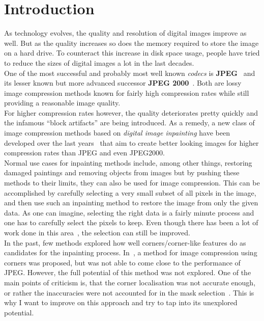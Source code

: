 \chapter{Introduction}\label{ch:Intro}
As technology evolves, the quality and resolution of digital images improve as well. But as the
quality increases so does the memory required to store the image on a hard drive. To counteract
this increase in disk space usage, people have tried to reduce the sizes of digital images a lot in the
last decades.\\
One of the most successful and probably most well known \textit{codecs}
is \textbf{JPEG}~\cite{wallace91} and its lesser known but more advanced successor \textbf{JPEG
2000}~\cite{jpeg2000}. Both are lossy image compression methods
known for fairly high compression rates while still providing a reasonable image quality.\\
For
higher compression rates however, the quality deteriorates pretty quickly and the infamous ``block
artifacts'' are being introduced. As a remedy, a new class of image compression methods based on
\textit{digital image inpainting} have been developed over the last
years~\cite{galic05, galic08, mainberger12, peloquin09, zimmer07, mainberger09, mainberger10, dong07, schmaltz09} that
aim to create better looking images for higher compression rates than JPEG and even JPEG2000. \\
Normal use cases for inpainting methods include, among other things, restoring damaged paintings and removing 
objects from images but by pushing these methods to their limits, they can also be used for image compression.
This can be accomplished by carefully selecting a very small subset of all pixels in the image, 
and then use such an inpainting method to restore the image from only the given data.
As one can imagine, selecting the right data is a fairly minute process and one has to carefully
select the pixels to keep. Even though there has been a lot of work done in this
area~\cite{belhachmi09, schmaltz14, hoeltgen12}, the
selection can still be improved.\\
In the past, few methods explored how well corners/corner-like features do as candidates for
the inpainting process. In~\cite{zimmer07}, a method for image compression using corners was
proposed, but was not able to come close to the performance of JPEG\@.
However, the full potential of this method was not explored. One of the main points of criticism is,
that the corner localisation was not accurate enough, or rather the inaccuracies were not accounted 
for in the mask selection~\cite{conversation}. This is why I want to improve on this approach and try 
to tap into its unexplored potential.\\

